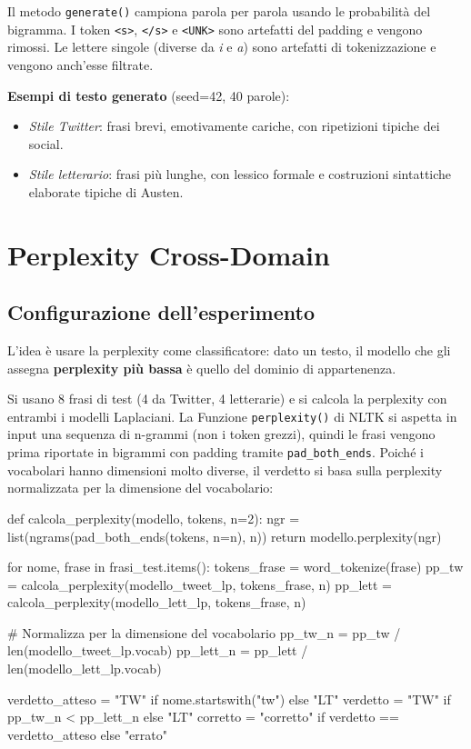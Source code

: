 ﻿\documentclass[12pt,a4paper]{article}
\begin{document}
Il metodo \texttt{generate()} campiona parola per parola usando le probabilità del bigramma. I token \texttt{<s>}, \texttt{</s>} e \texttt{<UNK>} sono artefatti del padding e vengono rimossi. Le lettere singole (diverse da \textit{i} e \textit{a}) sono artefatti di tokenizzazione e vengono anch'esse filtrate.

\textbf{Esempi di testo generato} (seed=42, 40 parole):
\begin{itemize}
  \item \textit{Stile Twitter}: frasi brevi, emotivamente cariche, con ripetizioni tipiche dei social.
  \item \textit{Stile letterario}: frasi più lunghe, con lessico formale e costruzioni sintattiche elaborate tipiche di Austen.
\end{itemize}

\section{Perplexity Cross-Domain}

\subsection{Configurazione dell'esperimento}

L'idea è usare la perplexity come classificatore: dato un testo, il modello che gli assegna \textbf{perplexity più bassa} è quello del dominio di appartenenza.

Si usano 8 frasi di test (4 da Twitter, 4 letterarie) e si calcola la perplexity con entrambi i modelli Laplaciani. La Funzione \texttt{perplexity()} di NLTK si aspetta in input una sequenza di n-grammi (non i token grezzi), quindi le frasi vengono prima riportate in bigrammi con padding tramite \texttt{pad\_both\_ends}. Poiché i vocabolari hanno dimensioni molto diverse, il verdetto si basa sulla perplexity normalizzata per la dimensione del vocabolario:

\begin{pylisting}[title={Classificazione tramite perplexity normalizzata}]
def calcola_perplexity(modello, tokens, n=2):
    ngr = list(ngrams(pad_both_ends(tokens, n=n), n))
    return modello.perplexity(ngr)

for nome, frase in frasi_test.items():
    tokens_frase = word_tokenize(frase)
    pp_tw   = calcola_perplexity(modello_tweet_lp, tokens_frase, n)
    pp_lett = calcola_perplexity(modello_lett_lp, tokens_frase, n)

    # Normalizza per la dimensione del vocabolario
    pp_tw_n   = pp_tw   / len(modello_tweet_lp.vocab)
    pp_lett_n = pp_lett / len(modello_lett_lp.vocab)

    verdetto_atteso = "TW" if nome.startswith("tw") else "LT"
    verdetto        = "TW" if pp_tw_n < pp_lett_n else "LT"
    corretto        = "corretto" if verdetto == verdetto_atteso else "errato"
\end{pylisting}
\end{document}
